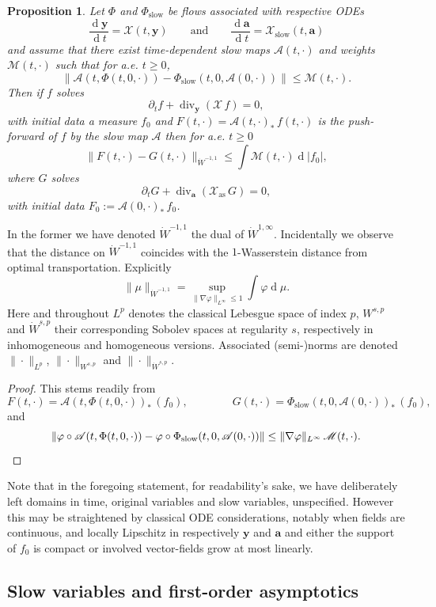 \documentclass[JEP,XML,SOM,Unicode]{cedram}
\let\mathcal\mathscr
\let\d\partial
\DeclareMathOperator\dD{d}\let\dd\dD
\DeclareMathOperator{\Div}{div}
\theoremstyle{plain}
\newtheorem{proposition}[theorem]{Proposition}
\theoremstyle{definition}
\newcommand{\bpr}{\begin{proposition}}
\newcommand{\epr}{\end{proposition}}
\newcommand\bfa{{\boldsymbol a}}
\newcommand\bfy{{\boldsymbol y}}
\newcommand\cA{{\mathcal A}}
\newcommand\cM{{\mathcal M}}
\newcommand\cX{{\mathcal X}}
\begin{document}
\bpr
\label{p:ODEtoPDE}
Let $\Phi$ and $\Phi_\mathrm{slow}$ be flows associated with respective ODEs
\[
\frac{\dD\bfy}{\dD t}=\cX(t,\bfy)\qquad\textrm{and}\qquad
\frac{\dD\bfa}{\dD t}=\cX_\mathrm{slow}(t,\bfa)
\]
and assume that there exist time-dependent slow maps $\cA(t,\cdot)$ and weights $\cM(t,\cdot)$ such that for a.e. $t\geq0$,
\[
\|\cA(t,\Phi(t,0,\cdot))-\Phi_\mathrm{slow}(t,0,\cA(0,\cdot))\|\leq \cM(t,\cdot).
\]
Then if $f$ solves
\[
\d_t f+\Div_\bfy (\cX\,f)=0,
\]
with initial data a measure $f_0$ and $F(t,\cdot)=\cA(t,\cdot)_*\,f(t,\cdot)$ is the push-forward of $f$ by the slow map $\cA$ then for a.e. $t\geq0$
\[
\|F(t,\cdot)-G(t,\cdot)\|_{\dot{W}^{-1,1}}\leq \int
\cM(t,\cdot) \dD|f_0|,
\]
where $G$ solves
\[
\d_t G +\Div_\bfa (\cX_\mathrm{as} \,G)=0,
\]
with initial data $F_0:=\cA(0,\cdot)_* \,f_0$.
\epr

In the former we have denoted $\dot{W}^{-1,1}$ the dual of $\dot{W}^{1,\infty}$. Incidentally we observe that the distance on $\dot{W}^{-1,1}$ coincides with the $1$-Wasserstein distance from optimal transportation. Explicitly
\[
\|\mu\|_{\dot{W}^{-1,1}}=\sup_{\|\nabla\varphi\|_{L^\infty}\leq
1}\int \varphi\dD \mu.
\]
Here and throughout $L^p$ denotes the classical Lebesgue space of index $p$, $W^{s,p}$ and $\dot{W}^{s,p}$ their corresponding Sobolev spaces at regularity $s$, respectively in inhomogeneous and homogeneous versions. Associated (semi-)norms are denoted $\|\cdot\|_{L^p}$, $\|\cdot\|_{W^{s,p}}$ and $\|\cdot\|_{\dot{W}^{s,p}}$.

\begin{proof}
This stems readily from
\[
F(t,\cdot)=\cA(t,\Phi(t,0,\cdot))_*\,(f_0),\qquad
\qquad
G(t,\cdot)=\Phi_\mathrm{slow}(t,0,\cA(0,\cdot))_*\,(f_0),
\]
and
\[
\|\varphi\circ\cA(t,\Phi(t,0,\cdot))-\varphi\circ \Phi_\mathrm{slow}(t,0,\cA(0,\cdot))\|
\leq \|\nabla\varphi\|_{L^\infty}\,\cM(t,\cdot).\qedhere
\]
\end{proof}

Note that in the foregoing statement, for readability's sake, we have deliberately left domains in time, original variables and slow variables, unspecified. However this may be straightened by classical ODE considerations, notably when fields are continuous, and locally Lipschitz in respectively $\bfy$ and $\bfa$ and either the support of $f_0$ is compact or involved vector-fields grow at most linearly.

\subsection{Slow variables and first-order asymptotics}
\end{document}
